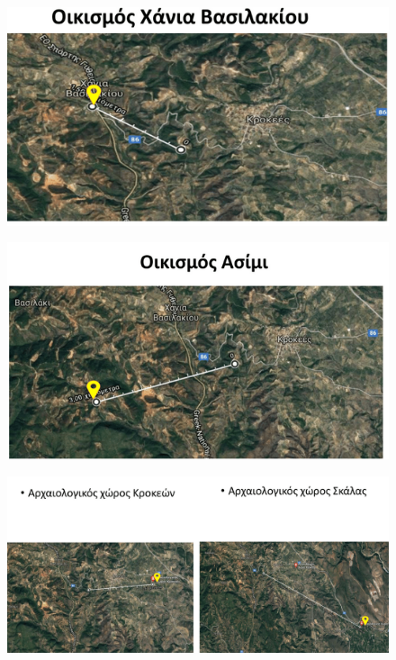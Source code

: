 \documentclass[12pt]{article}
\begin{document}
	\begin{figure} [H]
		\begin{center}
			\includegraphics [scale = 0.55] {map25.png}
		\end{center}
	\end{figure}

	\begin{figure} [H]
		\begin{center}
			\includegraphics [scale = 0.55] {map26.png}
		\end{center}
	\end{figure}

	\begin{figure} [H]
		\begin{center}
			\includegraphics [scale = 0.40] {map27.png}
		\end{center}
	\end{figure}
\end{document}

